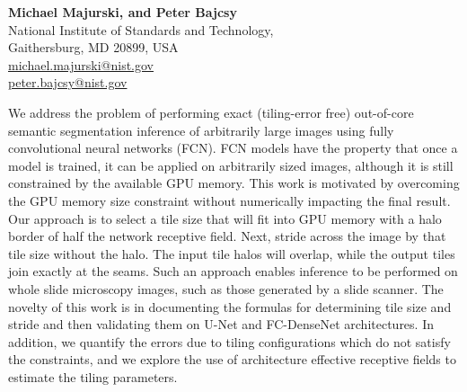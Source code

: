 \documentclass[10pt, indentfirst]{article}
\begin{document}
\setcounter{page}{1}


\title{\Huge{\textit{\papertitle}}
}
\date{\vspace{-7ex}}

\vspace*{-70pt}{\let\newpage\relax\maketitle}
\maketitle
\thispagestyle{title}
\begin{flushleft} \normalsize \textbf{Michael Majurski, and Peter Bajcsy} \\
	\vspace{9pt} 
	\normalsize National Institute of Standards and Technology, \\  
	Gaithersburg, MD 20899, USA \\
	
	\vspace{15pt} 
	\footnotesize \url{michael.majurski@nist.gov}\\
	\footnotesize \url{peter.bajcsy@nist.gov}\\
	\vspace{20pt} 
	
We address the problem of performing exact (tiling-error free) out-of-core semantic segmentation inference of arbitrarily large images using fully convolutional neural networks (FCN). 
FCN models have the property that once a model is trained, it can be applied on arbitrarily sized images, although it is still constrained by the available GPU memory. 
This work is motivated by overcoming the GPU memory size constraint without numerically impacting the final result. 
Our approach is to select a tile size that will fit into GPU memory with a halo border of half the network receptive field. 
Next, stride across the image by that tile size without the halo. 
The input tile halos will overlap, while the output tiles join exactly at the seams. 
Such an approach enables inference to be performed on whole slide microscopy images, such as those generated by a slide scanner.
The novelty of this work is in documenting the formulas for determining tile size and stride and then validating them on U-Net and FC-DenseNet architectures.
In addition, we quantify the errors due to tiling configurations which do not satisfy the constraints, and we explore the use of architecture effective receptive fields to estimate the tiling parameters. 
\\
	

\end{flushleft}
\end{document}
